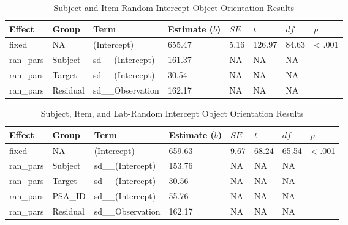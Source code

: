 \documentclass[
  man,mask,floatsintext]{apa7}
\begin{document}
\begin{table}[tbp]

\begin{center}
\begin{threeparttable}

\caption{\label{tab:item}Subject and Item-Random Intercept Object Orientation Results}

\begin{tabular}{llllllll}
\toprule
Effect & Group & Term & Estimate ($b$) & $SE$ & $t$ & $df$ & $p$\\
\midrule
fixed & NA & (Intercept) & 655.47 & 5.16 & 126.97 & 84.63 & < .001\\
ran\_pars & Subject & sd\_\_(Intercept) & 161.37 & NA & NA & NA & \\
ran\_pars & Target & sd\_\_(Intercept) & 30.54 & NA & NA & NA & \\
ran\_pars & Residual & sd\_\_Observation & 162.17 & NA & NA & NA & \\
\bottomrule
\end{tabular}

\end{threeparttable}
\end{center}

\end{table}

\begin{table}[tbp]

\begin{center}
\begin{threeparttable}

\caption{\label{tab:lab}Subject, Item, and Lab-Random Intercept Object Orientation Results}

\begin{tabular}{llllllll}
\toprule
Effect & Group & Term & Estimate ($b$) & $SE$ & $t$ & $df$ & $p$\\
\midrule
fixed & NA & (Intercept) & 659.63 & 9.67 & 68.24 & 65.54 & < .001\\
ran\_pars & Subject & sd\_\_(Intercept) & 153.76 & NA & NA & NA & \\
ran\_pars & Target & sd\_\_(Intercept) & 30.56 & NA & NA & NA & \\
ran\_pars & PSA\_ID & sd\_\_(Intercept) & 55.76 & NA & NA & NA & \\
ran\_pars & Residual & sd\_\_Observation & 162.17 & NA & NA & NA & \\
\bottomrule
\end{tabular}

\end{threeparttable}
\end{center}

\end{table}
\end{document}
